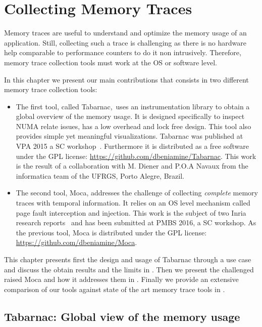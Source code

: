 \chapter{Collecting Memory Traces}

Memory traces are useful to understand and optimize the memory usage of an application.
Still, collecting such a trace is challenging as there is no hardware help comparable to performance counters to do it non intrusively.
Therefore, memory trace collection tools must work at the \gls{OS} or software level.

In this chapter we present our main contributions that consists in two different memory trace collection tools:
\begin{itemize}
    \item The first tool, called \gls{Tabarnac}, uses an instrumentation library to obtain a global overview of the memory usage.
It is designed specifically to inspect \gls{NUMA} relate issues, has a low overhead and lock free design.
This tool also provides simple yet meaningful visualizations.
\gls{Tabarnac} was published at \gls{VPA} 2015 a \gls{SC} workshop~\cite{Beniamine15TABARNAC}.
Furthermore it is distributed as a free software under the \gls{GPL} license: \url{https://github.com/dbeniamine/Tabarnac}.
This work is the result of a collaboration with M. Diener and P.O.A Navaux from the informatica team of the \gls{UFRGS}, Porto Alegre, Brazil.
    \item The second tool, \gls{Moca}, addresses the challenge of collecting \emph{complete} memory traces with temporal information.
It relies on an \gls{OS} level mechanism called page fault interception and injection.
This work is the subject of two Inria research reports~\cite{Beniamine15Memory,Beniamine16Moca} and has been submitted at \gls{PMBS} 2016, a \gls{SC} workshop.
As the previous tool, \gls{Moca} is distributed under the \gls{GPL} license: \url{https://github.com/dbeniamine/Moca}.
\end{itemize}

This chapter presents first the design and usage of \gls{Tabarnac} through a use case and discuss the obtain results and the limits in .
Then we present the challenged raised \gls{Moca} and how it addresses them in .
Finally we provide an extensive comparison of our tools against state of the art memory trace tools in .


\section{Tabarnac: Global view of the memory usage}
\label{sec:Tabarnac}


